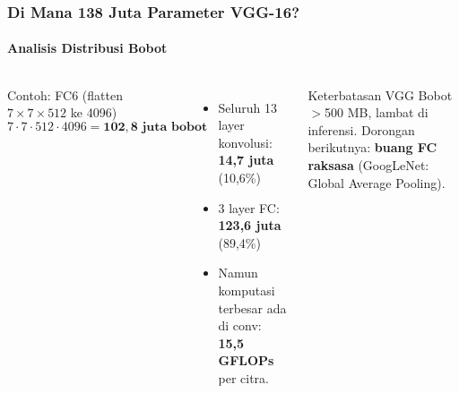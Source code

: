 \documentclass[t,aspectratio=169,xcolor=dvipsnames]{beamer}
\begin{document}
\begin{frame}
    \frametitle{Di Mana 138 Juta Parameter VGG-16?}
    \framesubtitle{Analisis Distribusi Bobot}
    \footnotesize

    \begin{columns}[T]
        \begin{exampleblock}{Contoh: FC6 (flatten $7\times7\times512$ ke 4096)}
            $$7\cdot7\cdot512\cdot4096 = \mathbf{102{,}8\text{ juta bobot}}$$
        \end{exampleblock}
        \begin{itemize}
            \item Seluruh 13 layer konvolusi: \textbf{14,7 juta} (10,6\%)
            \item 3 layer FC: \textbf{123,6 juta} (89,4\%)
            \item Namun komputasi terbesar ada di conv: \textbf{15,5 GFLOPs} per citra.
        \end{itemize}


        \begin{alertblock}{Keterbatasan VGG}
            Bobot $>$500 MB, lambat di inferensi. Dorongan berikutnya: \textbf{buang FC raksasa} (GoogLeNet: Global Average Pooling).
        \end{alertblock}
    \end{columns}
\end{frame}
\end{document}
